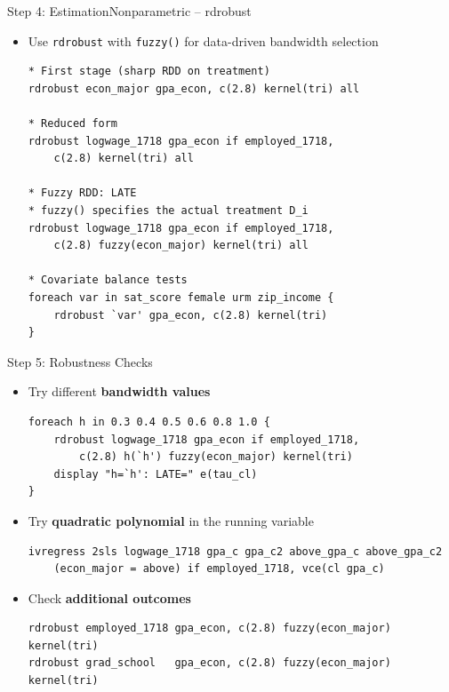 \documentclass[dvipsnames,hyperref={pdfpagelabels=false}]{beamer}
\begin{document}
\begin{frame}[fragile]{Step 4: Estimation}{Nonparametric -- rdrobust}
	\begin{itemize}
		\item Use \texttt{rdrobust} with \texttt{fuzzy()} for data-driven bandwidth selection
\begin{lstlisting}
* First stage (sharp RDD on treatment)
rdrobust econ_major gpa_econ, c(2.8) kernel(tri) all

* Reduced form
rdrobust logwage_1718 gpa_econ if employed_1718,
    c(2.8) kernel(tri) all

* Fuzzy RDD: LATE
* fuzzy() specifies the actual treatment D_i
rdrobust logwage_1718 gpa_econ if employed_1718,
    c(2.8) fuzzy(econ_major) kernel(tri) all

* Covariate balance tests
foreach var in sat_score female urm zip_income {
    rdrobust `var' gpa_econ, c(2.8) kernel(tri)
}
\end{lstlisting}
	\end{itemize}
\end{frame}



\begin{frame}[fragile]{Step 5: Robustness Checks}
	\begin{itemize}
		\item Try different \textbf{bandwidth values}
\begin{lstlisting}
foreach h in 0.3 0.4 0.5 0.6 0.8 1.0 {
    rdrobust logwage_1718 gpa_econ if employed_1718,
        c(2.8) h(`h') fuzzy(econ_major) kernel(tri)
    display "h=`h': LATE=" e(tau_cl)
}
\end{lstlisting}
		\vspace{0.1cm}
		\item Try \textbf{quadratic polynomial} in the running variable
\begin{lstlisting}
ivregress 2sls logwage_1718 gpa_c gpa_c2 above_gpa_c above_gpa_c2
    (econ_major = above) if employed_1718, vce(cl gpa_c)
\end{lstlisting}
		\vspace{0.1cm}
		\item Check \textbf{additional outcomes}
\begin{lstlisting}
rdrobust employed_1718 gpa_econ, c(2.8) fuzzy(econ_major) kernel(tri)
rdrobust grad_school   gpa_econ, c(2.8) fuzzy(econ_major) kernel(tri)
\end{lstlisting}
	\end{itemize}
\end{frame}
\end{document}
